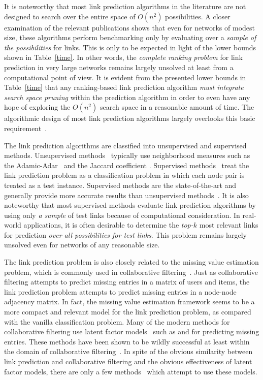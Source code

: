 It is noteworthy that most link prediction algorithms in the
literature are not designed to search over the entire space of
$O(n^2)$ possibilities. A closer examination of the relevant
publications shows that even for networks of modest size, these
algorithms perform benchmarking  only by evaluating over a {\em
sample of the possibilities} for links. This is only to be expected
in light of the lower bounds shown in Table~\ref{time}.  In other
words, the {\em complete ranking problem} for link prediction in
very large networks remains largely unsolved at least from a
computational point of view. It is evident from the presented lower
bounds in Table~\ref{time} that any ranking-based link prediction
algorithm {\em must integrate search space pruning} within the
prediction algorithm in order to even  have any  hope of exploring
the $O(n^2)$ search space in a reasonable amount of time. The
algorithmic design of most link prediction algorithms largely
overlooks this basic requirement~\cite{chancc,propflow}.

The link prediction algorithms are classified into unsupervised and
supervised methods. Unsupervised methods~\cite{kleinberg} typically
use neighborhood measures such as the Adamic-Adar~\cite{adamic} and
the Jaccard coefficient \cite{kleinberg}. Supervised methods~\cite{propflow} treat the
link prediction problem as a classification problem in which each node pair
is treated as a test instance. Supervised methods are the
state-of-the-art and generally provide more accurate results than
unsupervised methods~\cite{propflow}. It is also noteworthy that
most supervised methods evaluate link prediction algorithms by using
only {\em a sample} of test links because of computational
consideration.  In real-world applications, it is often desirable to
determine the {\em top-$k$} most relevant links for prediction {\em
over all possibilities for test links}. This problem remains largely
unsolved even for networks of any reasonable size.

The link prediction problem is also closely related to the missing value
estimation problem, which is commonly used in collaborative
filtering~\cite{adom}.  Just as collaborative filtering attempts to
predict missing entries in a matrix of users and items, the link
prediction problem attempts to predict missing entries in a
node-node adjacency matrix. In fact, the missing value estimation
framework seems to be a more compact and relevant model for the link
prediction problem, as compared with the vanilla classification
problem.  Many of the modern methods for collaborative filtering use
latent factor models~\cite{conceptualr,web} such as \SVD and
\NMF for predicting missing entries. These methods have been
shown to be wildly successful at least within the domain of
collaborative filtering~\cite{web}. In spite of the obvious
similarity between link prediction and collaborative filtering and
the obvious effectiveness of latent factor models, there are only a
few methods~\cite{menon} which attempt to use these models.

